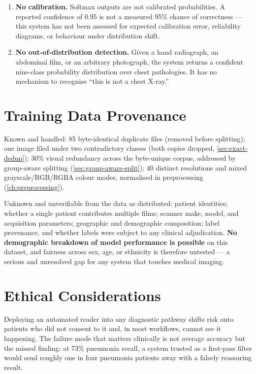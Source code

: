 \documentclass[11pt,a4paper,oneside]{report}
\begin{document}
\begin{enumerate}[label=\textbf{L\arabic*.}, leftmargin=2.2em]
\item \textbf{No calibration.} Softmax outputs are not calibrated
  probabilities. A reported confidence of 0.95 is not a measured 95\% chance
  of correctness --- this system has not been assessed for expected
  calibration error, reliability diagrams, or behaviour under distribution
  shift.

\item \textbf{No out-of-distribution detection.} Given a hand radiograph, an
  abdominal film, or an arbitrary photograph, the system returns a confident
  nine-class probability distribution over chest pathologies. It has no
  mechanism to recognise ``this is not a chest X-ray.''

\end{enumerate}

\section{Training Data Provenance}

Known and handled: 85 byte-identical duplicate files (removed before
splitting); one image filed under two contradictory classes (both copies
dropped, \cref{sec:exact-dedup}); 30\% visual redundancy across the
byte-unique corpus, addressed by group-aware splitting
(\cref{sec:group-aware-split}); 40 distinct resolutions and mixed
grayscale/RGB/RGBA colour modes, normalised in preprocessing
(\cref{ch:preprocessing}).

Unknown and unverifiable from the data as distributed: patient identities;
whether a single patient contributes multiple films; scanner make, model, and
acquisition parameters; geographic and demographic composition; label
provenance, and whether labels were subject to any clinical adjudication.
\textbf{No demographic breakdown of model performance is possible} on this
dataset, and fairness across sex, age, or ethnicity is therefore untested ---
a serious and unresolved gap for any system that touches medical imaging.

\section{Ethical Considerations}

Deploying an automated reader into any diagnostic pathway shifts risk onto
patients who did not consent to it and, in most workflows, cannot see it
happening. The failure mode that matters clinically is not average accuracy
but the missed finding: at 73\% pneumonia recall, a system trusted as a
first-pass filter would send roughly one in four pneumonia patients away with
a falsely reassuring result.
\end{document}
